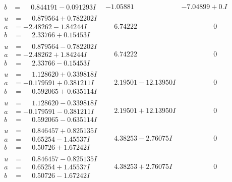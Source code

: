 \documentclass[1p]{elsarticle_modified}
\theoremstyle{definition}
\begin{document}
$$\begin{array}{c|c|c}
\begin{aligned}
b &= \phantom{-}0.844191 - 0.091293 I\end{aligned}
 & -1.05881\phantom{ +0.000000I} & -7.04899 + 0. I\phantom{ +0.000000I} \\ \hline\begin{aligned}
u &= \phantom{-}0.879564 + 0.782202 I \\
a &= -2.48262 - 1.84244 I \\
b &= \phantom{-}2.33766 + 0.15453 I\end{aligned}
 & \phantom{-}6.74222\phantom{ +0.000000I} & \phantom{-0.000000 } 0 \\ \hline\begin{aligned}
u &= \phantom{-}0.879564 - 0.782202 I \\
a &= -2.48262 + 1.84244 I \\
b &= \phantom{-}2.33766 - 0.15453 I\end{aligned}
 & \phantom{-}6.74222\phantom{ +0.000000I} & \phantom{-0.000000 } 0 \\ \hline\begin{aligned}
u &= \phantom{-}1.128620 + 0.339818 I \\
a &= -0.179591 + 0.381211 I \\
b &= \phantom{-}0.592065 + 0.635114 I\end{aligned}
 & \phantom{-}2.19501 - 12.13950 I & \phantom{-0.000000 } 0 \\ \hline\begin{aligned}
u &= \phantom{-}1.128620 - 0.339818 I \\
a &= -0.179591 - 0.381211 I \\
b &= \phantom{-}0.592065 - 0.635114 I\end{aligned}
 & \phantom{-}2.19501 + 12.13950 I & \phantom{-0.000000 } 0 \\ \hline\begin{aligned}
u &= \phantom{-}0.846457 + 0.825135 I \\
a &= \phantom{-}0.65254 - 1.45537 I \\
b &= \phantom{-}0.50726 + 1.67242 I\end{aligned}
 & \phantom{-}4.38253 - 2.76075 I & \phantom{-0.000000 } 0 \\ \hline\begin{aligned}
u &= \phantom{-}0.846457 - 0.825135 I \\
a &= \phantom{-}0.65254 + 1.45537 I \\
b &= \phantom{-}0.50726 - 1.67242 I\end{aligned}
 & \phantom{-}4.38253 + 2.76075 I & \phantom{-0.000000 } 0 \\ \hline\begin{aligned}

\end{aligned}
\end{array}$$
\end{document}

